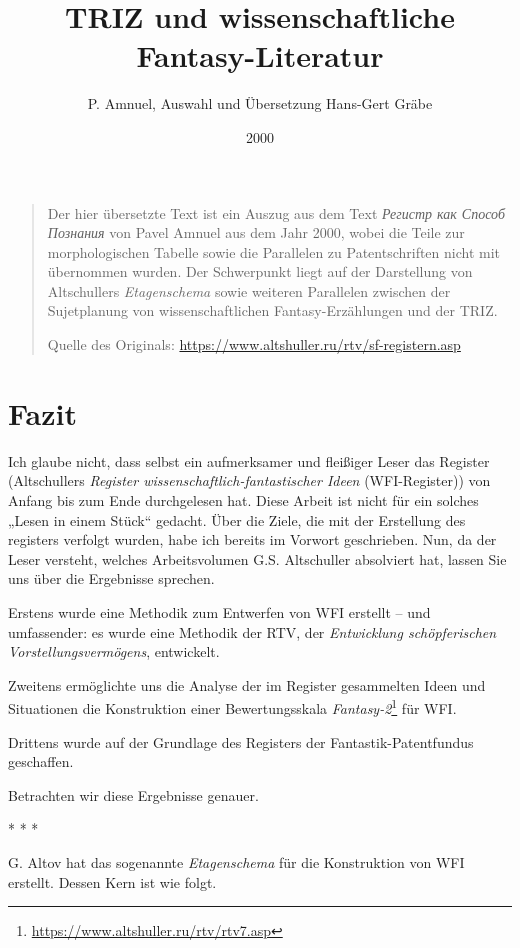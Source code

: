 \documentclass[11pt,a4paper]{article}
\title{TRIZ und wissenschaftliche Fantasy-Literatur}
\author{P. Amnuel, Auswahl und Übersetzung Hans-Gert Gräbe}
\date{2000}
\begin{document}
\maketitle

\begin{quote}
  Der hier übersetzte Text ist ein Auszug aus dem Text
  \emph{\foreignlanguage{russian}{Регистр как Способ Познания}} von Pavel
  Amnuel aus dem Jahr 2000, wobei die Teile zur morphologischen Tabelle sowie
  die Parallelen zu Patentschriften nicht mit übernommen wurden. Der
  Schwerpunkt liegt auf der Darstellung von Altschullers \emph{Etagenschema}
  sowie weiteren Parallelen zwischen der Sujetplanung von wissenschaftlichen
  Fantasy-Erzählungen und der TRIZ.

  Quelle des Originals: \url{https://www.altshuller.ru/rtv/sf-registern.asp}
\end{quote}

\section*{Fazit}
Ich glaube nicht, dass selbst ein aufmerksamer und fleißiger Leser das
Register (Altschullers \emph{Register wissenschaftlich-fantastischer Ideen}
(WFI-Register)) von Anfang bis zum Ende durchgelesen hat. Diese Arbeit ist
nicht für ein solches „Lesen in einem Stück“ gedacht. Über die Ziele, die mit
der Erstellung des registers verfolgt wurden, habe ich bereits im Vorwort
geschrieben.  Nun, da der Leser versteht, welches Arbeitsvolumen
G.S. Altschuller absolviert hat, lassen Sie uns über die Ergebnisse sprechen.

Erstens wurde eine Methodik zum Entwerfen von WFI erstellt -- und umfassender:
es wurde eine Methodik der RTV, der \emph{Entwicklung schöpferischen
Vorstellungsvermögens}, entwickelt.

Zweitens ermöglichte uns die Analyse der im Register gesammelten Ideen und
Situationen die Konstruktion einer Bewertungsskala
\emph{Fantasy-2}\footnote{\url{https://www.altshuller.ru/rtv/rtv7.asp}} für
WFI.

Drittens wurde auf der Grundlage des Registers der Fantastik-Patentfundus
geschaffen.

Betrachten wir diese Ergebnisse genauer.

\begin{center}  * * * \end{center}

G. Altov hat das sogenannte \emph{Etagenschema} für die Konstruktion von WFI
erstellt. Dessen Kern ist wie folgt.
\end{document}
